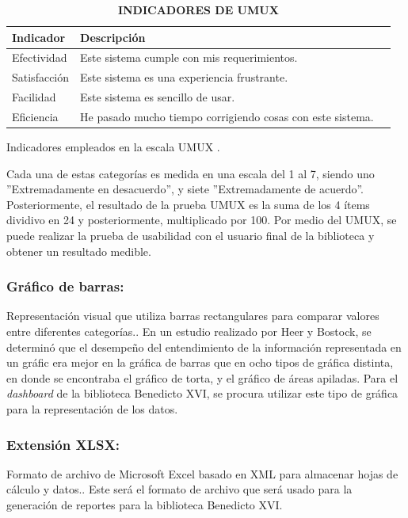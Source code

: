 \documentclass[spanish]{ieee_upb}
\begin{document}
\begin{table}[htpb]
    \centering
    \caption[Indicadores de UMUX]{\bfseries INDICADORES DE UMUX}
    \label{tab:evaluacion_sistema}
    \begin{tabular}{lll} \hline
        \textbf{Indicador} & \textbf{Descripción} \\ \hline
        Efectividad  & Este sistema cumple con mis requerimientos. \\
        Satisfacción & Este sistema es una experiencia frustrante. \\ 
        Facilidad    & Este sistema es sencillo de usar. \\ 
        Eficiencia   & He pasado mucho tiempo corrigiendo cosas con este sistema. \\ \hline
    \end{tabular}
    \vspace{2mm}
    \newline
    \small{Indicadores empleados en la escala UMUX \cite{finstad2010usabilityUMUX}.}
\end{table}



Cada una de estas categorías es medida en una escala del 1 al 7, siendo uno ''Extremadamente en desacuerdo'', y siete ''Extremadamente de acuerdo''. Posteriormente, el resultado de la prueba UMUX es la suma de los 4 ítems dividivo en 24 y posteriormente, multiplicado por 100\cite{finstad2010usabilityUMUX}. Por medio del UMUX, se puede realizar la prueba de usabilidad con el usuario final de la biblioteca y obtener un resultado medible.

  \subsubsection{Gráfico de barras: } Representación visual que utiliza barras rectangulares para comparar valores entre diferentes categorías.\cite{healy2018data}. En un estudio realizado por Heer y Bostock\cite{heer2010crowdsourcingESTUDIOGRAFICAS}, se determinó que el desempeño del entendimiento de la información representada en un gráfic era mejor en la gráfica de barras que en ocho tipos de gráfica distinta, en donde se encontraba el gráfico de torta, y el gráfico de áreas apiladas. Para el \textit{dashboard} de la biblioteca Benedicto XVI, se procura utilizar este tipo de gráfica para la representación de los datos.


   \subsubsection{Extensión XLSX: } Formato de archivo de Microsoft Excel basado en XML para almacenar hojas de cálculo y datos.\cite{microsoft_xlsx_2019}. Este será el formato de archivo que será usado para la generación de reportes para la biblioteca Benedicto XVI.
\end{document}
